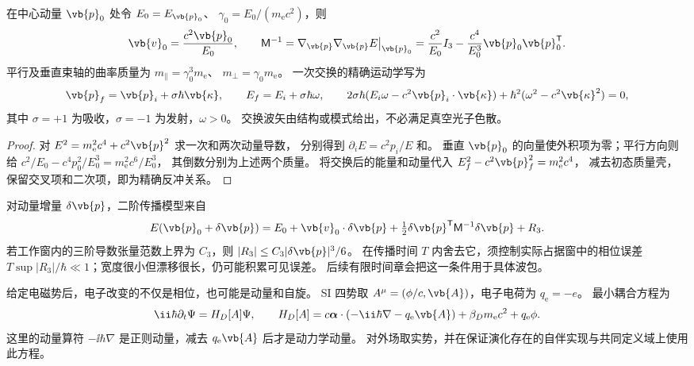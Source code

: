 \begin{proposition}
在中心动量 $\vb{p}_0$ 处令 $E_0=E_{\vb{p}_0}$、
$\gamma_0=E_0/(m_{\mathrm e}c^2)$，则
\begin{equation}
\vb{v}_0=\frac{c^2\vb{p}_0}{E_0},\qquad
\mathsf M^{-1}=\nabla_{\vb{p}}\nabla_{\vb{p}}E\big|_{\vb{p}_0}
=\frac{c^2}{E_0}I_3-\frac{c^4}{E_0^3}\vb{p}_0\vb{p}_0^{\mathsf T}.
\label{eq:feqo-primer-curvature}
\end{equation}
平行及垂直束轴的曲率质量为 $m_\parallel=\gamma_0^3m_{\mathrm e}$、
$m_\perp=\gamma_0m_{\mathrm e}$。
一次交换的精确运动学写为
\begin{equation}
\vb{p}_f=\vb{p}_i+\sigma\hbar\vb{\kappa},\qquad
E_f=E_i+\sigma\hbar\omega,\qquad
2\sigma\hbar(E_i\omega-c^2\vb{p}_i\cdot\vb{\kappa})
+\hbar^2(\omega^2-c^2\vb{\kappa}^2)=0,
\label{eq:feqo-primer-recoil}
\end{equation}
其中 $\sigma=+1$ 为吸收，$\sigma=-1$ 为发射，$\omega>0$。
交换波矢由结构或模式给出，不必满足真空光子色散。
\end{proposition}
\begin{proof}
对 $E^2=m_{\mathrm e}^2c^4+c^2\vb{p}^2$ 求一次和两次动量导数，
分别得到 $\partial_iE=c^2p_i/E$ 和。
垂直 $\vb{p}_0$ 的向量使外积项为零；平行方向则给
$c^2/E_0-c^4p_0^2/E_0^3=m_{\mathrm e}^2c^6/E_0^3$，
其倒数分别为上述两个质量。
将交换后的能量和动量代入 $E_f^2-c^2\vb{p}_f^2=m_{\mathrm e}^2c^4$，
减去初态质量壳，保留交叉项和二次项，即为精确反冲关系。
\end{proof}

对动量增量 $\delta\vb{p}$，二阶传播模型来自
\[
E(\vb{p}_0+\delta\vb{p})
=E_0+\vb{v}_0\cdot\delta\vb{p}
+\tfrac12\delta\vb{p}^{\mathsf T}\mathsf M^{-1}\delta\vb{p}+R_3.
\]
若工作窗内的三阶导数张量范数上界为 $C_3$，则
$|R_3|\le C_3|\delta\vb{p}|^3/6$。
在传播时间 $T$ 内舍去它，须控制实际占据窗中的相位误差
$T\sup|R_3|/\hbar\ll1$；宽度很小但漂移很长，仍可能积累可见误差。
后续有限时间章会把这一条件用于具体波包。

给定电磁势后，电子改变的不仅是相位，也可能是动量和自旋。
SI 四势取 $A^\mu=(\phi/c,\vb{A})$，电子电荷为 $q_{\mathrm e}=-e$。
最小耦合方程为
\begin{equation}
\ii\hbar\partial_t\Psi=H_D[A]\Psi,\qquad
H_D[A]=c\boldsymbol\alpha\cdot(-\ii\hbar\nabla-q_{\mathrm e}\vb{A})
+\beta_Dm_{\mathrm e}c^2+q_{\mathrm e}\phi.
\label{eq:feqo-primer-dirac-em}
\end{equation}
这里的动量算符 $-\ii\hbar\nabla$ 是正则动量，减去 $q_{\mathrm e}\vb{A}$ 后才是动力学动量。
对外场取实势，并在保证演化存在的自伴实现与共同定义域上使用此方程。

